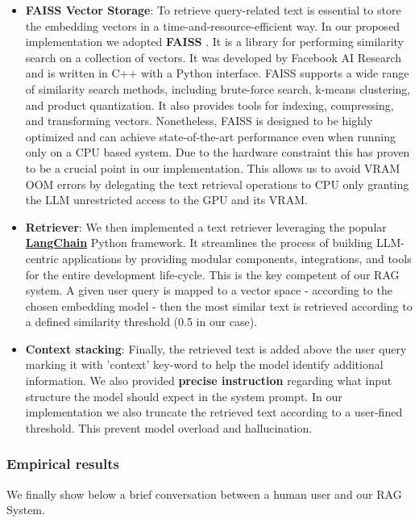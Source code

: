 \documentclass{article}
\begin{document}
\begin{itemize}
		\item \textbf{FAISS Vector Storage}: To retrieve query-related text is essential to store the embedding vectors in a time-and-resource-efficient way. In our proposed implementation we adopted \textbf{FAISS} \cite{douze2024faisslibrary}. It is a library for performing similarity search on a collection of vectors.  It was developed by Facebook AI Research and is written in C++ with a Python interface.  FAISS supports a wide range of similarity search methods, including brute-force search, k-means clustering, and product quantization.  It also provides tools for indexing, compressing, and transforming vectors. Nonetheless, FAISS is designed to be highly optimized and can achieve state-of-the-art performance even when running only on a CPU based system. 
		Due to the hardware constraint this has proven to be a crucial point in our implementation. This allows us to avoid VRAM OOM errors by delegating the text retrieval operations to CPU only granting the LLM unrestricted access to the GPU and its VRAM.
		
		\item \textbf{Retriever}: We then implemented a text retriever leveraging the popular \href{https://python.langchain.com/docs/introduction/}{\textbf{LangChain}} Python framework. It streamlines the process of building LLM-centric applications by providing modular components, integrations, and tools for the entire development life-cycle. This is the key competent of our RAG system.
		A given user query is mapped to a vector space - according to the chosen embedding model - then the most similar text is retrieved according to a defined similarity threshold (0.5 in our case). 
		
		\item \textbf{Context stacking}: Finally, the retrieved text is added above the user query marking it with 'context' key-word to help the model identify additional information. We also provided \textbf{precise instruction} regarding what input structure the model should expect in the system prompt.
		In our implementation we also truncate the retrieved text according to a user-fined threshold. This prevent model overload and hallucination.
		
	\end{itemize}

	\subsubsection{Empirical results}
	We finally show below a brief conversation between a human user and our RAG System.
	
\end{document}
